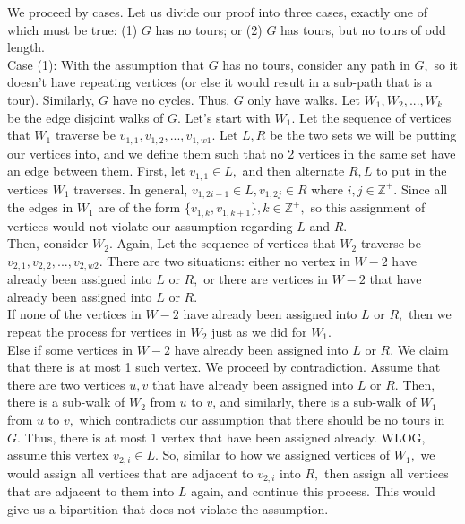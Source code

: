 \documentclass{article}
\begin{document}
\indent We proceed by cases. Let us divide our proof into three cases, exactly one of which must be true: (1) $G$ has no tours; or (2) $G$ has tours, but no tours of odd length. \\[.3cm]
\indent Case (1): With the assumption that $G$ has no tours, consider any path in $G,$ so it doesn't have repeating vertices (or else it would result in a sub-path that is a tour). Similarly, $G$ have no cycles. Thus, $G$ only have walks. Let $W_1, W_2, ..., W_k$ be the edge disjoint walks of $G.$ Let's start with $W_1.$ Let the sequence of vertices that $W_1$ traverse be $v_{1,1}, v_{1,2}, ..., v_{1,w1}.$ Let $L, R$ be the two sets we will be putting our vertices into, and we define them such that no 2 vertices in the same set have an edge between them. First, let $v_{1,1}\in L,$ and then alternate $R, L$ to put in the vertices $W_1$ traverses. In general, $v_{1, 2i-1}\in L, v_{1, 2j}\in R$ where $i,j\in\mathbb{Z^+}.$ Since all the edges in $W_1$ are of the form $\{v_{1, k}, v_{1, k+1}\}, k\in\mathbb{Z^+},$ so this assignment of vertices would not violate our assumption regarding $L$ and $R.$ \\[.2cm]
\indent Then, consider $W_2.$ Again, Let the sequence of vertices that $W_2$ traverse be $v_{2,1}, v_{2,2}, ..., v_{2,w2}.$ There are two situations: either no vertex in $W-2$ have already been assigned into $L$ or $R,$ or there are vertices in $W-2$ that have already been assigned into $L$ or $R.$\\[.2cm]
\indent\indent If none of the vertices in $W-2$ have already been assigned into $L$ or $R,$ then we repeat the process for vertices in $W_2$ just as we did for $W_1.$ \\[.2cm]
\indent\indent Else if some vertices in $W-2$ have already been assigned into $L$ or $R.$ We claim that there is at most 1 such vertex. We proceed by contradiction. Assume that there are two vertices $u, v$ that have already been assigned into $L$ or $R.$ Then, there is a sub-walk of $W_2$ from $u$ to $v$, and similarly, there is a sub-walk of $W_1$ from $u$ to $v,$ which contradicts our assumption that there should be no tours in $G.$ Thus, there is at most 1 vertex that have been assigned already. WLOG, assume this vertex $v_{2, i}\in L.$ So, similar to how we assigned vertices of $W_1,$ we would assign all vertices that are adjacent to $v_{2, i}$ into $R,$ then assign all vertices that are adjacent to them into $L$ again, and continue this process. This would give us a bipartition that does not violate the assumption. \\[.2cm]
\end{document}
